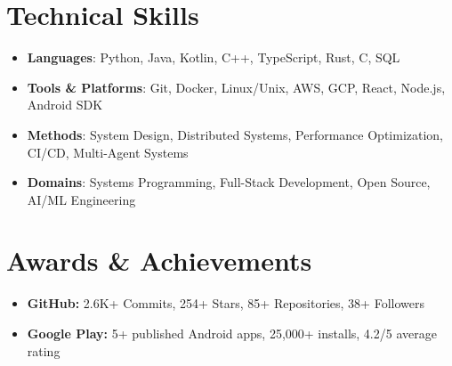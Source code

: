\documentclass[letterpaper,11pt]{article}
\newcommand{\resumeItem}[1]{
  \item\small{#1 \vspace{-2pt}}
}
\newcommand{\resumeSubHeadingListStart}{\begin{itemize}[leftmargin=0.15in, label={}]}
\newcommand{\resumeSubHeadingListEnd}{\end{itemize}}
\begin{document}
\section{Technical Skills}
\resumeSubHeadingListStart
  \resumeItem{\textbf{Languages}: Python, Java, Kotlin, C++, TypeScript, Rust, C, SQL}
  \resumeItem{\textbf{Tools \& Platforms}: Git, Docker, Linux/Unix, AWS, GCP, React, Node.js, Android SDK}
  \resumeItem{\textbf{Methods}: System Design, Distributed Systems, Performance Optimization, CI/CD, Multi-Agent Systems}
  \resumeItem{\textbf{Domains}: Systems Programming, Full-Stack Development, Open Source, AI/ML Engineering}
\resumeSubHeadingListEnd

\section{Awards \& Achievements}
\resumeSubHeadingListStart
  \resumeItem{\textbf{GitHub:} 2.6K+ Commits, 254+ Stars, 85+ Repositories, 38+ Followers}
  \resumeItem{\textbf{Google Play:} 5+ published Android apps, 25,000+ installs, 4.2/5 average rating}
\resumeSubHeadingListEnd
\end{document}
